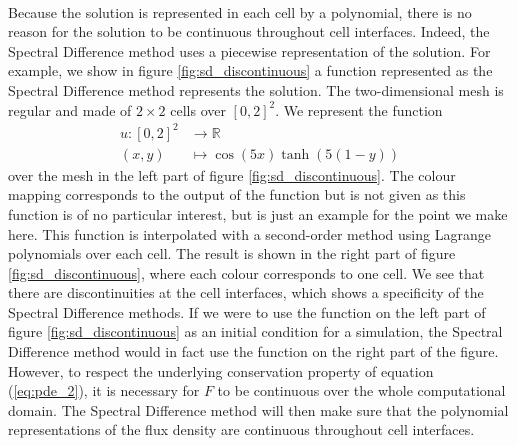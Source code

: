       \paragraph{}
      Because the solution is represented in each cell by a polynomial, there is no reason for the solution to be continuous throughout cell interfaces.
      Indeed, the Spectral Difference method uses a piecewise representation of the solution.
      For example, we show in figure \ref{fig:sd_discontinuous} a function represented as the Spectral Difference method represents the solution.
      The two-dimensional mesh is regular and made of $2 \times 2$ cells over $\left[0, 2\right]^2$.
      We represent the function
      \begin{equation}
        \begin{aligned}
          u \colon \left[0, 2\right]^2 &\to \mathbb{R}\\
          \left(x, y\right) &\mapsto \cos\left(5x\right) \tanh\left(5\left(1 - y\right)\right)
        \end{aligned}
      \end{equation}
      over the mesh in the left part of figure \ref{fig:sd_discontinuous}.
      The colour mapping corresponds to the output of the function but is not given as this function is of no particular interest, but is just an example for the point we make here.
      This function is interpolated with a second-order method using Lagrange polynomials over each cell.
      The result is shown in the right part of figure \ref{fig:sd_discontinuous}, where each colour corresponds to one cell.
      We see that there are discontinuities at the cell interfaces, which shows a specificity of the Spectral Difference methods.
      If we were to use the function on the left part of figure \ref{fig:sd_discontinuous} as an initial condition for a simulation, the Spectral Difference method would in fact use the function on the right part of the figure.
      However, to respect the underlying conservation property of equation (\ref{eq:pde_2}), it is necessary for $F$ to be continuous over the whole computational domain.
      The Spectral Difference method will then make sure that the polynomial representations of the flux density are continuous throughout cell interfaces.

